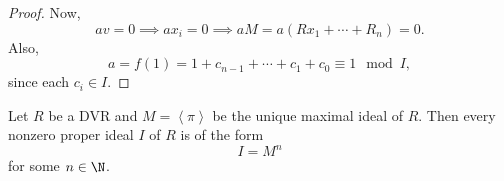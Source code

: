 \documentclass[pmath441]{subfiles}
\begin{document}
\begin{proof}
        Now,
        \begin{equation*}
            av = 0 \implies ax_i = 0 \implies aM = a\left( Rx_1+\cdots+R_n \right) = 0.
        \end{equation*}
        Also,
        \begin{equation*}
            a = f\left( 1 \right) = 1+c_{n-1}+\cdots+c_1+c_0 \equiv 1 \mod I,
        \end{equation*}
        since each $c_i\in I$.
    \end{proof}
    
    \begin{prop}{}
        Let $R$ be a DVR and $M = \left< \pi \right>$ be the unique maximal ideal of $R$. Then every nonzero proper ideal $I$ of $R$ is of the form
        \begin{equation*}
            I = M^n
        \end{equation*}
        for some $n\in\N$.
    \end{prop}
    
\end{document}
